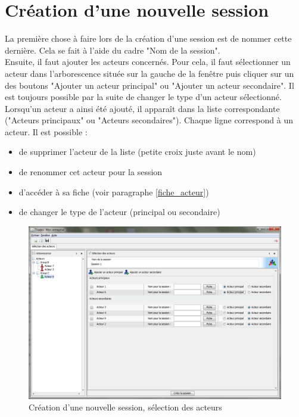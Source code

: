 \section{Création d'une nouvelle session}
La première chose à faire lors de la création d'une session est de nommer cette dernière. Cela se fait à l'aide du cadre "Nom de la session".\\

Ensuite, il faut ajouter les acteurs concernés. Pour cela, il faut sélectionner un acteur dans l'arborescence située sur la gauche de la fenêtre puis cliquer sur un des boutons "Ajouter un acteur principal" ou "Ajouter un acteur secondaire". Il est toujours possible par la suite de changer le type d'un acteur sélectionné.\\

Lorsqu'un acteur a ainsi été ajouté, il apparaît dans la liste correspondante ("Acteurs principaux" ou "Acteurs secondaires"). Chaque ligne correspond à un acteur. Il est possible :\\
\begin{itemize}
\item de supprimer l'acteur de la liste (petite croix juste avant le nom)
\item de renommer cet acteur pour la session
\item d'accéder à sa fiche (voir paragraphe \ref{fiche_acteur})
\item de changer le type de l'acteur (principal ou secondaire)\\
\end{itemize}



\begin{figure}[h!t]
\centering
\includegraphics[scale=0.35]{images/selection_acteurs.png}

\caption{Création d'une nouvelle session, sélection des acteurs}

\end{figure}

